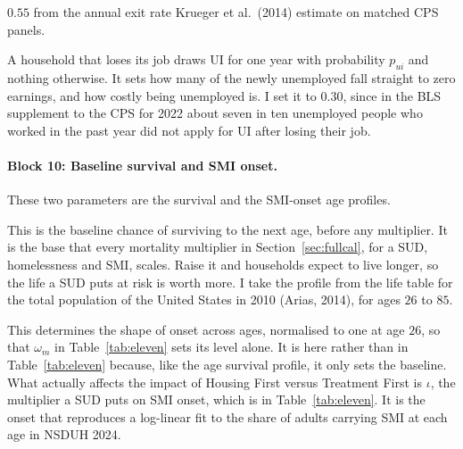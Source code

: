 \documentclass[10pt]{article}
\begin{document}
\begin{description}
$0.55$ from the annual exit rate Krueger et al.\ (2014) estimate on
matched CPS panels.
\item[$p_{ui}$, the share of separations that receive UI.] A household that
loses its job draws UI for one year with probability $p_{ui}$ and nothing
otherwise. It sets how many of the newly unemployed fall straight to zero
earnings, and how costly being unemployed is. I set it to $0.30$, since in the BLS supplement to the CPS for 2022 about seven in ten unemployed people who worked in the past year did not apply for UI after losing their job.
\end{description}

\paragraph{Block 10: Baseline survival and SMI onset.} These two parameters are the survival and
the SMI-onset age profiles.
\begin{description}\setlength{\itemsep}{0.25em}\setlength{\parskip}{0em}
\item[$\bar\phi(j)$, baseline survival by age.] This is the baseline chance of surviving to the
next age, before any multiplier. It is the base that every mortality multiplier in Section~\ref{sec:fullcal}, for a SUD, homelessness and SMI, scales. Raise it and households expect to live longer, so the life a SUD puts at risk is worth more. I take the profile from the life table for the total population of the United States in 2010 (Arias, 2014), for ages $26$ to $85$.

\item[$\varsigma_m(j)$, the age profile of SMI onset.] This determines the shape of onset
across ages, normalised to one at age $26$, so that $\omega_m$ in Table~\ref{tab:eleven} sets its
level alone. It is here rather than in Table~\ref{tab:eleven} because, like the age survival profile, it only sets the
baseline. What actually affects the impact of Housing First versus Treatment First is $\iota$, the multiplier a SUD puts
on SMI onset, which is in Table~\ref{tab:eleven}. It is the onset that
reproduces a log-linear fit to the share of adults carrying SMI at each age in NSDUH
2024.
\end{description}
\end{document}

